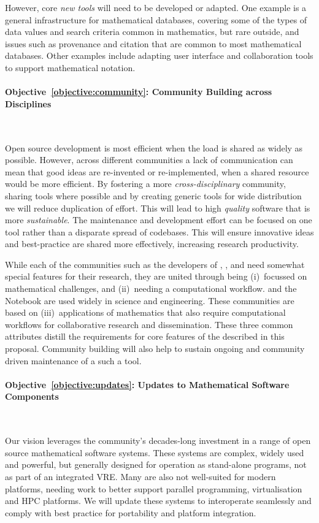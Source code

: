 \documentclass[noworkareas,deliverables,\classoptions]{euproposal}       %
\begin{document}
\begin{proposal}
However, core \emph{new tools} will need to be developed or
adapted. One example is a general infrastructure for mathematical
databases, covering some of the types of data values and search
criteria common in mathematics, but rare outside, and issues such as
provenance and citation that are common to most mathematical
databases. Other examples include adapting user interface and
collaboration tools to support mathematical notation.

\paragraph{Objective~\ref{objective:community}: Community Building across Disciplines}\

Open source development is most efficient when the load is shared as
widely as possible. However, across different communities a lack of
communication can mean that good ideas are re-invented or
re-implemented, when a shared resource would be more efficient. By
fostering a more \emph{cross-disciplinary} community, sharing tools
where possible and by creating generic tools for wide distribution we
will reduce duplication of effort. This will lead to high
\emph{quality} software that is more \emph{sustainable}. The
maintenance and development effort can be focused on one tool rather
than a disparate spread of codebases. This will ensure innovative
ideas and best-practice are shared more effectively, increasing
research productivity.

While each of the communities such as the developers of \Sage,
\Singular, and \GAP need somewhat special features for their research,
they are united through being (i)~focussed on mathematical challenges,
and (ii)~needing a computational workflow. \IPython and the \Jupyter
Notebook are used widely in science and engineering. These communities
are based on (iii)~applications of mathematics that also require
computational workflows for collaborative research and
dissemination. These three common attributes distill the requirements
for core features of the \VREs described in this proposal. Community
building will also help to sustain ongoing and community driven
maintenance of a such a tool.


\paragraph{Objective~\ref{objective:updates}: Updates to Mathematical
  Software Components}\

Our vision leverages the community's decades-long investment in a
range of open source mathematical software systems. These systems are
complex, widely used and powerful, but generally designed for
operation as stand-alone programs, not as part of an integrated
VRE. Many are also not well-suited for modern platforms, needing work
to better support parallel programming, virtualisation and HPC
platforms. We will update these systems to interoperate seamlessly and
comply with best practice for portability and platform integration.



\end{proposal}
\end{document}
